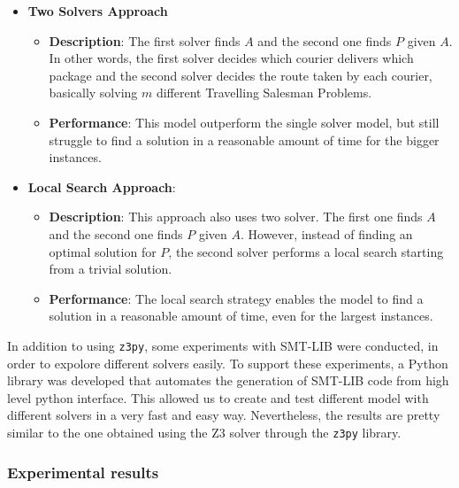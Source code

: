 \begin{itemize}
    \item \textbf{Two Solvers Approach}
    \begin{itemize}
        \item \textbf{Description}: The first solver  finds $A$ and the second one finds $P$ given $A$. In other words, the first solver decides which courier delivers which package and the second solver decides the route taken by each courier, basically solving $m$ different Travelling Salesman Problems. 
        \item \textbf{Performance}: This model outperform the single solver model, but still struggle to find a solution in a reasonable amount of time for the bigger instances.
    \end{itemize}

    \item \textbf{Local Search Approach}:
    \begin{itemize}
        \item \textbf{Description}: This approach also uses two solver. The first one finds $A$ and the second one finds $P$ given $A$. However, instead of finding an optimal solution for $P$, the second solver performs a local search starting from a trivial solution.
        \item \textbf{Performance}: The local search strategy enables the model to find a solution in a reasonable amount of time, even for the largest instances.
    \end{itemize} 

\end{itemize}

In addition to using \texttt{z3py}, some experiments with SMT-LIB were conducted, in order to expolore different solvers easily. To support these experiments, a Python library was developed that automates the generation of SMT-LIB code from high level python interface. This allowed us to create and test different model with different solvers in a very fast and easy way. Nevertheless, the results are pretty similar to the one obtained using the Z3 solver through the \texttt{z3py} library.

\subsubsection{Experimental results}


